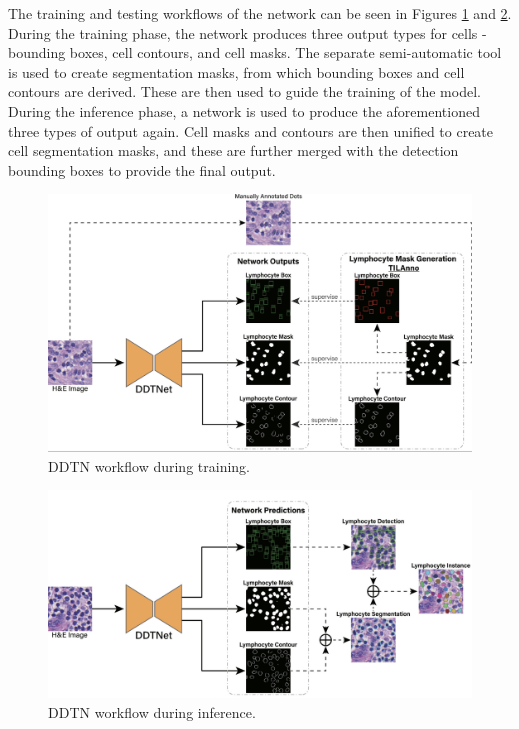 The training and testing workflows of the network can be seen in Figures \ref{fig:rw-ddtn-train} and \ref{fig:rw-ddtn-test}. During the training phase, the network produces three output types for cells - bounding boxes, cell contours, and cell masks. The separate semi-automatic tool is used to create segmentation masks, from which bounding boxes and cell contours are derived. These are then used to guide the training of the model. During the inference phase, a network is used to produce the aforementioned three types of output again. Cell masks and contours are then unified to create cell segmentation masks, and these are further merged with the detection bounding boxes to provide the final output.

\begin{figure}[H]
    \begin{centering}
    \includegraphics[width=12cm]{assets/images/rw-ddtn-train.png}
    \par\end{centering}
    \caption{DDTN workflow during training.}
    \label{fig:rw-ddtn-train}
\end{figure}

\begin{figure}[H]
    \begin{centering}
    \includegraphics[width=12cm]{assets/images/rw-ddtn-test.png}
    \par\end{centering}
    \caption{DDTN workflow during inference.}
    \label{fig:rw-ddtn-test}
\end{figure}

